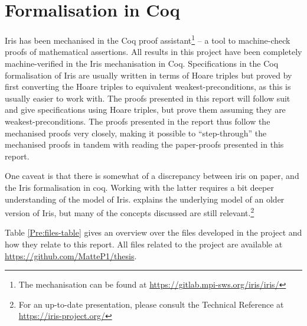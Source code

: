 \documentclass[a4paper, 10pt]{report}
\theoremstyle{definition}
\begin{document}
\section{Formalisation in Coq}
\label{Pre:section:coq}

Iris has been mechanised in the Coq proof assistant\footnote{The mechanisation can be found at \url{https://gitlab.mpi-sws.org/iris/iris/}} -- a tool to machine-check proofs of mathematical assertions. All results in this project have been completely machine-verified in the Iris mechanisation in Coq. Specifications in the Coq formalisation of Iris are usually written in terms of Hoare triples but proved by first converting the Hoare triples to equivalent weakest-preconditions, as this is usually easier to work with. The proofs presented in this report will follow suit and give specifications using Hoare triples, but prove them assuming they are weakest-preconditions. The proofs presented in the report thus follow the mechanised proofs very closely, making it possible to ``step-through'' the mechanised proofs in tandem with reading the paper-proofs presented in this report.

One caveat is that there is somewhat of a discrepancy between iris on paper, and the Iris formalisation in coq. Working with the latter requires a bit deeper understanding of the model of Iris. \citet{DBLP:journals/jfp/JungKJBBD18} explains the underlying model of an older version of Iris, but many of the concepts discussed are still relevant.\footnote{For an up-to-date presentation, please consult the Technical Reference at \url{https://iris-project.org/}}

Table \ref{Pre:files-table} gives an overview over the files developed in the project and how they relate to this report. All files related to the project are available at \url{https://github.com/MatteP1/thesis}.
\end{document}
